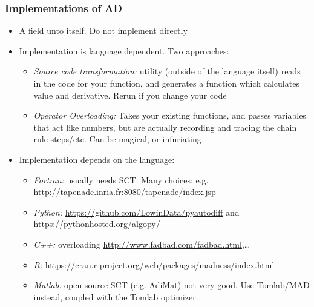 \documentclass[nofootline]{etk-presentation}
\begin{document}
\begin{frame}[fragile]	\frametitle{Implementations of AD}
	\begin{itemize}
		\item A field unto itself.  Do not implement directly
		\item Implementation is language dependent.  Two approaches:
		\begin{itemize}
			\item \textit{Source code transformation:} utility (outside of the language itself) reads in the code for your function, and generates a function which calculates value and derivative.  Rerun if you change your code
			\item \textit{Operator Overloading:} Takes your existing functions, and passes variables that act like numbers, but are actually recording and tracing the chain rule steps/etc.  Can be magical, or infuriating
		\end{itemize}
		\item Implementation depends on the language:
		\begin{itemize}
			\item \textit{Fortran:} usually needs SCT.  Many choices: e.g. \url{http://tapenade.inria.fr:8080/tapenade/index.jsp}
			\item \textit{Python:} \url{https://github.com/LowinData/pyautodiff} and \url{https://pythonhosted.org/algopy/}
			\item \textit{C++:} overloading \url{http://www.fadbad.com/fadbad.html},\ldots
			\item \textit{R:} \url{https://cran.r-project.org/web/packages/madness/index.html}
			\item \textit{Matlab:} open source SCT (e.g. AdiMat) not very good.  Use Tomlab/MAD instead, coupled with the Tomlab optimizer.
		\end{itemize}
	\end{itemize}
\end{frame}

	\begin{frame}\frametitle{}
	\bigskip
	\bigskip
	\bigskip	
	\begin{center}
		{\huge {}}
	\end{center}
\end{frame}
\end{document}
